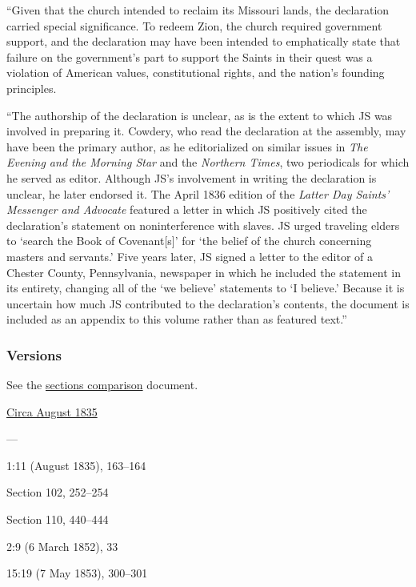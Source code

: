 			``Given that the church intended to reclaim its Missouri lands, the declaration carried special significance. To redeem Zion, the church required government support, and the declaration may have been intended to emphatically state that failure on the government's part to support the Saints in their quest was a violation of American values, constitutional rights, and the nation's founding principles.

			``The authorship of the declaration is unclear, as is the extent to which JS was involved in preparing it. Cowdery, who read the declaration at the assembly, may have been the primary author, as he editorialized on similar issues in \textit{The Evening and the Morning Star} and the \textit{Northern Times}, two periodicals for which he served as editor. Although JS's involvement in writing the declaration is unclear, he later endorsed it. The April 1836 edition of the \textit{Latter Day Saints' Messenger and Advocate} featured a letter in which JS positively cited the declaration's statement on noninterference with slaves. JS urged traveling elders to `search the Book of Covenant[s]' for `the belief of the church concerning masters and servants.' Five years later, JS signed a letter to the editor of a Chester County, Pennsylvania, newspaper in which he included the statement in its entirety, changing all of the `we believe' statements to `I believe.' Because it is uncertain how much JS contributed to the declaration's contents, the document is included as an appendix to this volume rather than as featured text.''

	\subsubsection{Versions}
		\label{DC134-V}
		
		See the \href{https://drive.google.com/file/d/1goAvNz8jS4R8slYfMG_db55Ty2z_vmgK/view?usp=sharing}{sections comparison} document.
	
		\begin{compactdesc}
			\item[JSP] \hyperref[EMS-1835-JS-CIR-AUG-1835-GOV]{Circa August 1835}
			\item[BC] ---
			\item[MA] 1:11 (August 1835), 163--164
			\item[DC 1835] Section 102, 252--254
			\item[DC 1844] Section 110, 440--444
			\item[DN] 2:9 (6 March 1852), 33
			\item[MS] 15:19 (7 May 1853), 300--301
		\end{compactdesc}

